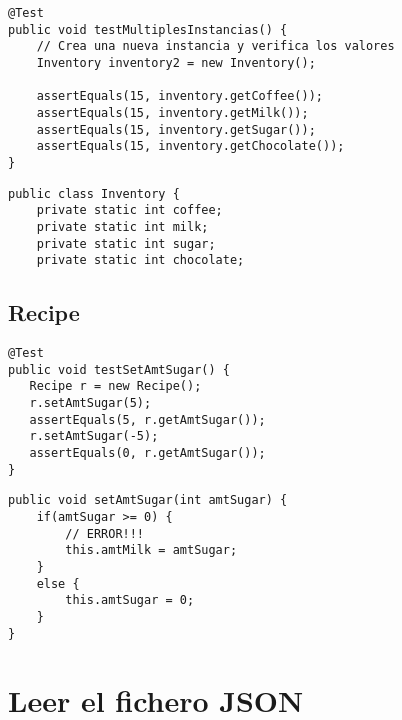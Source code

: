 \begin{paracol}{2}
    
    \begin{lstlisting}
@Test
public void testMultiplesInstancias() {
    // Crea una nueva instancia y verifica los valores
    Inventory inventory2 = new Inventory();
    
    assertEquals(15, inventory.getCoffee());
    assertEquals(15, inventory.getMilk());
    assertEquals(15, inventory.getSugar());
    assertEquals(15, inventory.getChocolate());
}
    \end{lstlisting}

    \switchcolumn

    \begin{lstlisting}[caption={No tiene sentido que estos valores sean estaticos, hay un inventario por cada instancia}]
public class Inventory {
    private static int coffee;
    private static int milk;
    private static int sugar;
    private static int chocolate;
    \end{lstlisting}
\end{paracol}

\subsection{Recipe}

\begin{paracol}{2}
    \begin{lstlisting}
@Test
public void testSetAmtSugar() {
   Recipe r = new Recipe();
   r.setAmtSugar(5);
   assertEquals(5, r.getAmtSugar());
   r.setAmtSugar(-5);
   assertEquals(0, r.getAmtSugar());
}
    \end{lstlisting}
    
    \switchcolumn

    \begin{lstlisting}
public void setAmtSugar(int amtSugar) {
    if(amtSugar >= 0) {
        // ERROR!!! 
        this.amtMilk = amtSugar;
    }
    else {
        this.amtSugar = 0;
    }
}
    \end{lstlisting}
\end{paracol}

\section{Leer el fichero JSON}

